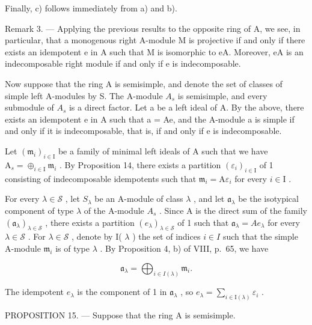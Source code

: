 Finally, c) follows immediately from a) and b).

Remark 3. --- Applying the previous results to the opposite ring of A, we see, in particular, that a monogenous right A-module M is projective if and only if there exists an idempotent e in A such that M is isomorphic to eA. Moreover, eA is an indecomposable right module if and only if e is indecomposable.

Now suppose that the ring A is semisimple, and denote the set of classes of simple left A-modules by S. The A-module \(A_{s}\) is semisimple, and every submodule of \(A_{s}\) is a direct factor. Let a be a left ideal of A. By the above, there exists an idempotent e in A such that a = Ae, and the A-module a is simple if and only if it is indecomposable, that is, if and only if e is indecomposable.

Let \((\mathfrak{m}_i)_{i\in \mathrm{I}}\) be a family of minimal left ideals of A such that we have \(\mathrm{A}_s = \oplus_{i\in \mathrm{I}}\mathfrak{m}_i\) . By Proposition 14, there exists a partition \((\varepsilon_i)_{i\in \mathrm{I}}\) of 1 consisting of indecomposable idempotents such that \(\mathfrak{m}_i = \mathrm{A}\varepsilon_i\) for every \(i\in \mathrm{I}\) .

For every \(\lambda \in \mathcal{S}\) , let \(S_{\lambda}\) be an A-module of class \(\lambda\) , and let \(\mathfrak{a}_{\lambda}\) be the isotypical component of type \(\lambda\) of the A-module \(A_s\) . Since A is the direct sum of the family \((\mathfrak{a}_{\lambda})_{\lambda \in \mathcal{S}}\) , there exists a partition \((e_{\lambda})_{\lambda \in \mathcal{S}}\) of 1 such that \(\mathfrak{a}_{\lambda} = Ae_{\lambda}\) for every \(\lambda \in \mathcal{S}\) . For \(\lambda \in \mathcal{S}\) , denote by I( \(\lambda\) ) the set of indices \(i \in I\) such that the simple A-module \(\mathfrak{m}_i\) is of type \(\lambda\) . By Proposition 4, b) of VIII, p.~65, we have

\[
\mathfrak {a} _ {\lambda} = \bigoplus_ {i \in I (\lambda)} \mathfrak {m} _ {i}.\tag{3}
\]

The idempotent \(e_{\lambda}\) is the component of 1 in \(\mathfrak{a}_{\lambda}\) , so \(e_{\lambda} = \sum_{i\in \mathrm{I}(\lambda)}\varepsilon_i\) .

PROPOSITION 15. --- Suppose that the ring A is semisimple.

